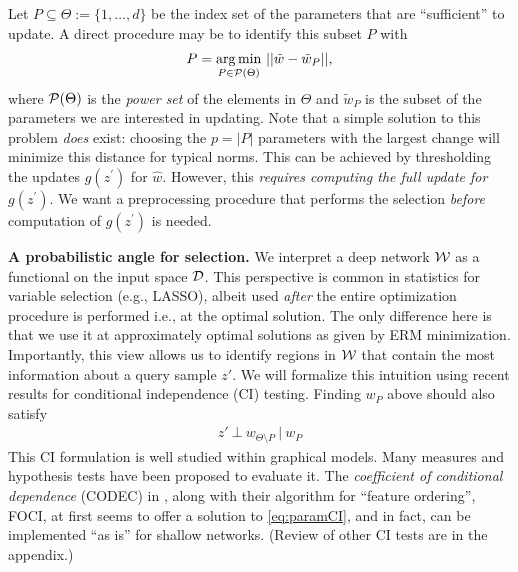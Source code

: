 Let $P \subseteq \Theta:= \{1,\ldots, d\}$ be the index set of the parameters that are ``sufficient'' to update. A direct procedure may be to identify this subset $P$ with
\begin{align}\label{eq:normsel}
P = \underset{P \in \mathcal{P}(\Theta)}{\arg\min} \ ||\tilde{w} - \tilde{w}_P||,
\end{align}
where $\mathcal{P}(\Theta)$ is the {\em power set} of the elements in $\Theta$ and $\tilde{w}_P$ is the subset of the parameters we are interested in updating. 
Note that a simple solution to this problem {\em does} exist: choosing the $p=|P|$ parameters with the largest change will minimize this distance for typical norms. This can be achieved by thresholding the updates $g(z^\prime)$ for $\hat{w}$. However, this \textit{requires computing the full update for $g(z^\prime)$}. We want a preprocessing procedure that performs the selection \textit{before} computation of $g(z^\prime)$ is needed.

\noindent\textbf{A probabilistic angle for selection.} 
We interpret a deep network $\mathcal{W}$ as a functional on the input space $\mathcal{D}$. This perspective is common in statistics for variable selection (e.g., LASSO), albeit used {\em after} the entire optimization procedure is performed i.e., at the optimal solution. The only difference here is that we use it at approximately optimal solutions as given by ERM minimization. Importantly, this view allows us to identify regions in $\mathcal{W}$ that contain the most information about a query sample $z'$. 
We will formalize this intuition using recent results for conditional independence (CI) testing.
Finding $w_P$ above should also satisfy
\begin{align}\label{eq:paramCI}
    z'\ \bot\ w_{\Theta\setminus P}\ |\ w_P
\end{align}
This CI formulation is well studied within graphical models. Many measures and hypothesis tests have been proposed to evaluate it.
The {\em coefficient of conditional dependence} (CODEC)  in \cite{codec}, along with their algorithm for ``feature ordering'', FOCI, at first seems to offer a solution to  \eqref{eq:paramCI}, and in fact, can be implemented ``as is'' for shallow networks. (Review of other CI tests are in the appendix.)


